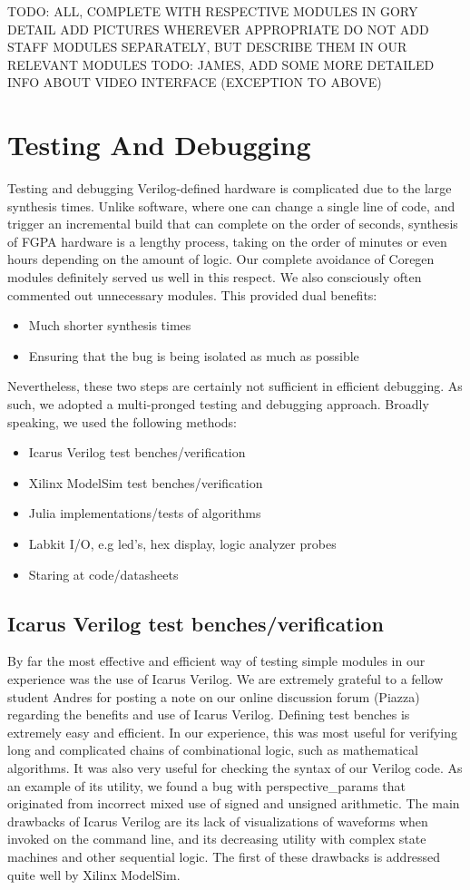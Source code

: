 \documentclass{article}
\begin{document}
TODO: ALL, COMPLETE WITH RESPECTIVE MODULES IN GORY DETAIL
ADD PICTURES WHEREVER APPROPRIATE
DO NOT ADD STAFF MODULES SEPARATELY, BUT DESCRIBE THEM IN OUR RELEVANT MODULES
TODO: JAMES, ADD SOME MORE DETAILED INFO ABOUT VIDEO INTERFACE
(EXCEPTION TO ABOVE)

\section{Testing And Debugging}

Testing and debugging Verilog-defined hardware is complicated due to the large synthesis times.
Unlike software, where one can change a single line of code,
and trigger an incremental build that can complete on the order of seconds,
synthesis of FGPA hardware is a lengthy process,
taking on the order of minutes or even hours depending on the amount of logic.
Our complete avoidance of Coregen modules definitely served us well in this respect.
We also consciously often commented out unnecessary modules.
This provided dual benefits:
\begin{itemize}
\item Much shorter synthesis times
\item Ensuring that the bug is being isolated as much as possible
\end{itemize}
Nevertheless, these two steps are certainly not sufficient in efficient debugging.
As such, we adopted a multi-pronged testing and debugging approach.
Broadly speaking, we used the following methods:
\begin{itemize}
\item Icarus Verilog test benches/verification
\item Xilinx ModelSim test benches/verification
\item Julia implementations/tests of algorithms
\item Labkit I/O, e.g led's, hex display, logic analyzer probes
\item Staring at code/datasheets
\end{itemize}

\subsection{Icarus Verilog test benches/verification}
By far the most effective and efficient way of testing simple modules in our experience was the use of Icarus Verilog.
We are extremely grateful to a fellow student Andres for posting a note on our online discussion forum (Piazza) regarding the benefits and use of Icarus Verilog.
Defining test benches is extremely easy and efficient.
In our experience, this was most useful for verifying long and complicated chains of combinational logic, such as mathematical algorithms.
It was also very useful for checking the syntax of our Verilog code.
As an example of its utility, we found a bug with perspective\_params that originated from incorrect mixed use of signed and unsigned arithmetic.
The main drawbacks of Icarus Verilog are its lack of visualizations of waveforms when invoked on the command line,
and its decreasing utility with complex state machines and other sequential logic.
The first of these drawbacks is addressed quite well by Xilinx ModelSim.
\end{document}
